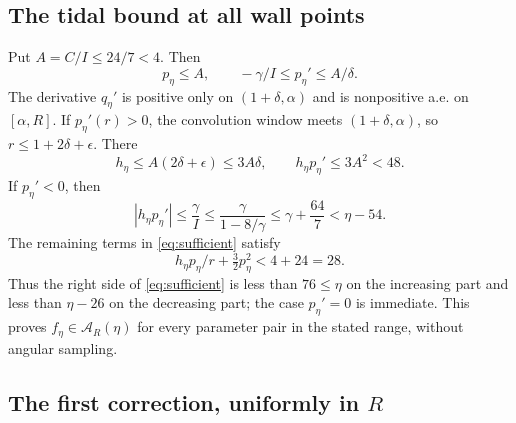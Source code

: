 \documentclass[11pt,a4paper]{article}
\numberwithin{equation}{section}
\begin{document}
\subsection{The tidal bound at all wall points}

Put \(A=C/I\le24/7<4\). Then
\[
 p_\eta\le A,\qquad -\gamma/I\le p_\eta'\le A/\delta.
\]
The derivative \(q_\eta'\) is positive only on \((1+\delta,\alpha)\)
and is nonpositive a.e. on \([\alpha,R]\).
If \(p_\eta'(r)>0\), the convolution window meets
\((1+\delta,\alpha)\), so \(r\le1+2\delta+\epsilon\). There
\[
 h_\eta\le A(2\delta+\epsilon)\le3A\delta,\qquad
 h_\eta p_\eta'\le3A^2<48.
\]
If \(p_\eta'<0\), then
\[
 |h_\eta p_\eta'|\le\frac{\gamma}{I}
 \le\frac{\gamma}{1-8/\gamma}
 \le\gamma+\frac{64}{7}<\eta-54.
\]
The remaining terms in \eqref{eq:sufficient} satisfy
\[
 h_\eta p_\eta/r+\tfrac32p_\eta^2<4+24=28 .
\]
Thus the right side of \eqref{eq:sufficient} is less than \(76\le\eta\)
on the increasing part and less than \(\eta-26\) on the decreasing
part; the case \(p_\eta'=0\) is immediate. This proves
\(f_\eta\in\mathcal A_R(\eta)\) for every parameter pair in the stated
range, without angular sampling.

\subsection{The first correction, uniformly in \texorpdfstring{\(R\)}{R}}
\end{document}
